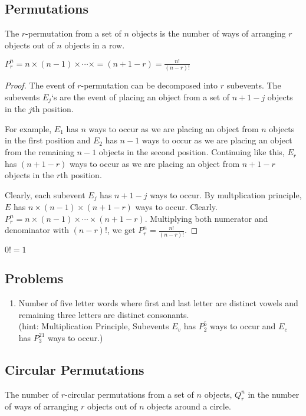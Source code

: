 \subsection{Permutations}
\begin{definition}[Permutation]
	The $r$-permutation from a set of $n$ objects is the number of ways of arranging $r$ objects out of $n$ objects in a row.
\end{definition}
\begin{theorem}
	$P^n_r = n \times (n-1) \times \dotsb \times = (n+1-r) = \frac{n!}{(n-r)!}$
\end{theorem}
\begin{proof}
	The event of $r$-permutation can be decomposed into $r$ subevents.
	The subevents $E_j$`s are the event of placing an object from a set of $n+1-j$ objects in the $j$th position.

	\begin{commentary}
	For example, $E_1$ has $n$ ways to occur as we are placing an object from $n$ objects in the first position and $E_2$ has $n-1$ ways to occur as we are placing an object from the remaining $n-1$ objects in the second position.
	Continuing like this, $E_r$ has $(n+1-r)$ ways to occur as we are placing an object from $n+1-r$ objects in the $r$th position.
	\end{commentary}

	Clearly, each subevent $E_j$ has $n+1-j$ ways to occur.
	By multplication principle, $E$ has $n \times (n-1) \times (n+1-r)$ ways to occur.
	Clearly. $P^n_r = n \times (n-1) \times \dotsb \times (n+1-r)$.
	Multiplying both numerator and denominator with $(n-r)!$, we get $P^n_r = \frac{n!}{(n-r)!}$.
\end{proof}

\begin{remark} $0! = 1$ \end{remark}

\subsection*{Problems}
\begin{enumerate}
	\item Number of five letter words where first and last letter are distinct vowels and remaining three letters are distinct consonants.\\
	(hint: Multiplication Principle, Subevents $E_v$ has $P^5_2$ ways to occur and $E_c$ has $P^{21}_3$ ways to occur.)
\end{enumerate}
\subsection{Circular Permutations}
\begin{definition}
	The number of $r$-circular permutations from a set of $n$ objects, $Q^n_r$ in the number of ways of arranging $r$ objects out of $n$ objects around a circle.
\end{definition}

